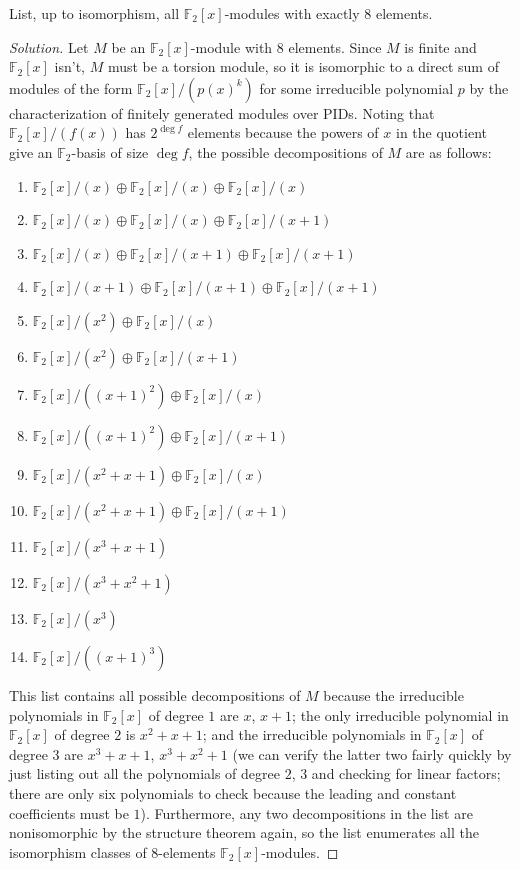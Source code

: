 \documentclass[10pt]{article}
\providecommand{\FF}{\mathbb F}
\providecommand{\ii}{\item}
\newenvironment{soln}{\begin{proof}[Solution]}{\end{proof}}
\begin{document}
\begin{problem}
    List, up to isomorphism, all $\FF_2[x]$-modules with exactly $8$ elements.
\end{problem}

\begin{soln}
    Let $M$ be an $\FF_2[x]$-module with $8$ elements.
    Since $M$ is finite and $\FF_2[x]$ isn't, $M$ must be a torsion module,
    so it is isomorphic to a direct sum of modules of the form
    $\FF_2[x]/(p(x)^k)$ for some irreducible polynomial $p$
    by the characterization of finitely generated modules over PIDs.
    Noting that $\FF_2[x]/(f(x))$ has $2^{\deg f}$ elements
    because the powers of $x$ in the quotient
    give an $\FF_2$-basis of size $\deg f$,
    the possible decompositions of $M$ are as follows:
    \begin{enumerate}[(1),itemsep=1pt]
	\ii $\FF_2[x]/(x)\oplus\FF_2[x]/(x)\oplus\FF_2[x]/(x)$
	\ii $\FF_2[x]/(x)\oplus\FF_2[x]/(x)\oplus\FF_2[x]/(x+1)$
	\ii $\FF_2[x]/(x)\oplus\FF_2[x]/(x+1)\oplus\FF_2[x]/(x+1)$
	\ii $\FF_2[x]/(x+1)\oplus\FF_2[x]/(x+1)\oplus\FF_2[x]/(x+1)$
	\ii $\FF_2[x]/(x^2)\oplus\FF_2[x]/(x)$
	\ii $\FF_2[x]/(x^2)\oplus\FF_2[x]/(x+1)$
	\ii $\FF_2[x]/((x+1)^2)\oplus\FF_2[x]/(x)$
	\ii $\FF_2[x]/((x+1)^2)\oplus\FF_2[x]/(x+1)$
	\ii $\FF_2[x]/(x^2 + x + 1)\oplus\FF_2[x]/(x)$
	\ii $\FF_2[x]/(x^2 + x + 1)\oplus\FF_2[x]/(x+1)$
	\ii $\FF_2[x]/(x^3 + x + 1)$
	\ii $\FF_2[x]/(x^3 + x^2 + 1)$
	\ii $\FF_2[x]/(x^3)$
	\ii $\FF_2[x]/((x+1)^3)$
    \end{enumerate}
    This list contains all possible decompositions of $M$ because
    the irreducible polynomials in $\FF_2[x]$ of degree $1$ are
    $x$, $x+1$;
    the only irreducible polynomial in $\FF_2[x]$ of degree $2$
    is $x^2 + x + 1$; and
    the irreducible polynomials in $\FF_2[x]$ of degree $3$ are
    $x^3 + x + 1$, $x^3 + x^2 +1$
    (we can verify the latter two fairly quickly by just listing
    out all the polynomials of degree $2$, $3$ and checking for linear factors;
    there are only six polynomials to check because
    the leading and constant coefficients must be $1$).
    Furthermore, any two decompositions in the list are nonisomorphic
    by the structure theorem again, so the list enumerates
    all the isomorphism classes of $8$-elements $\FF_2[x]$-modules.
\end{soln}
\end{document}
